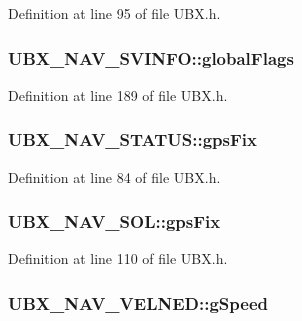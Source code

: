 Definition at line 95 of file U\-B\-X.\-h.

\hypertarget{group___g_s_p_module_ga9ea30e93a506e7749f8121ff4e811aae}{
\subsubsection[{global\-Flags}]{ U\-B\-X\-\_\-\-N\-A\-V\-\_\-\-S\-V\-I\-N\-F\-O\-::global\-Flags}}\label{group___g_s_p_module_ga9ea30e93a506e7749f8121ff4e811aae}


Definition at line 189 of file U\-B\-X.\-h.

\hypertarget{group___g_s_p_module_ga9ada0b00d91062449f398439afec8e70}{
\subsubsection[{gps\-Fix}]{ U\-B\-X\-\_\-\-N\-A\-V\-\_\-\-S\-T\-A\-T\-U\-S\-::gps\-Fix}}\label{group___g_s_p_module_ga9ada0b00d91062449f398439afec8e70}


Definition at line 84 of file U\-B\-X.\-h.

\hypertarget{group___g_s_p_module_gae821898e9ca043790d8f58da75355f38}{
\subsubsection[{gps\-Fix}]{ U\-B\-X\-\_\-\-N\-A\-V\-\_\-\-S\-O\-L\-::gps\-Fix}}\label{group___g_s_p_module_gae821898e9ca043790d8f58da75355f38}


Definition at line 110 of file U\-B\-X.\-h.

\hypertarget{group___g_s_p_module_ga1c5f6e6ddf0495f4c308b520ae809266}{
\subsubsection[{g\-Speed}]{ U\-B\-X\-\_\-\-N\-A\-V\-\_\-\-V\-E\-L\-N\-E\-D\-::g\-Speed}}\label{group___g_s_p_module_ga1c5f6e6ddf0495f4c308b520ae809266}


